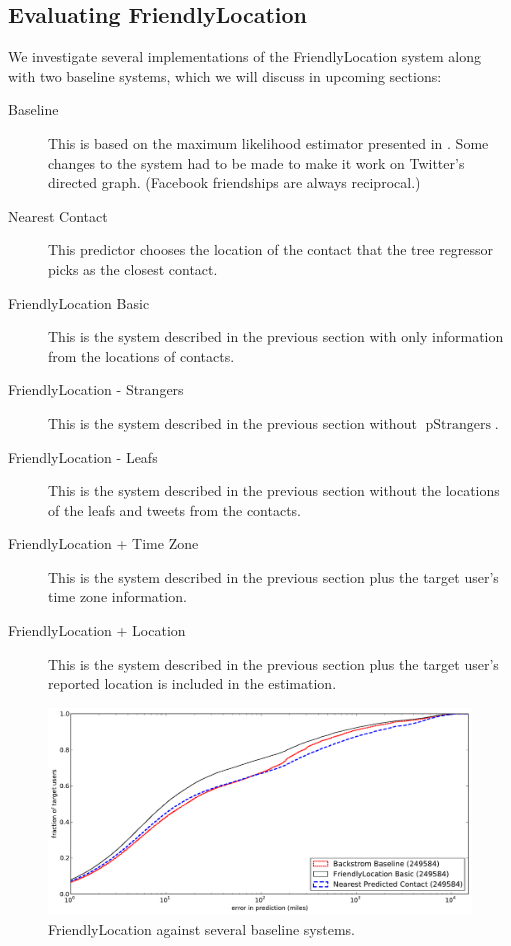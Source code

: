 \documentclass[letterpaper]{article}
\DeclareMathOperator{\pStrangers}{pStrangers}
\begin{document}
\subsection{Evaluating FriendlyLocation}
We investigate several implementations of the FriendlyLocation system along
with two baseline systems, which we will discuss in upcoming sections:
\begin{description}
\item[Baseline] This is based on the maximum likelihood estimator presented in
    \cite{backstrom2010find}. Some changes to the system had to be made to make it
    work on Twitter's directed graph. (Facebook friendships are always
    reciprocal.)
\item[Nearest Contact] This predictor chooses the location of the contact that
    the tree regressor picks as the closest contact.
\item[FriendlyLocation Basic] This is the system described in the previous
    section with only information from the locations of contacts.
\item[FriendlyLocation - Strangers] This is the system described in the previous
    section without $\pStrangers$.
\item[FriendlyLocation - Leafs] This is the system described in the previous
    section without the locations of the leafs and tweets from the contacts.
\ifdefined\THESIS
\item[FriendlyLocation + Time Zone] This is the system described in the previous
    section plus the target user's time zone information.
\item[FriendlyLocation + Location] This is the system described in the previous
    section plus the target user's reported location is included in the
    estimation.
\fi
\end{description}

\begin{figure}[tb]
\centering
\includegraphics[width=.9\linewidth]{figures/fl_basic.pdf}
\caption{
    FriendlyLocation against several baseline systems.
}
\label{fig:results}
\end{figure}
\end{document}
